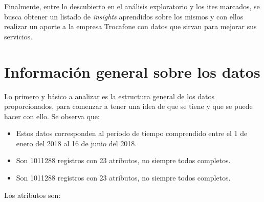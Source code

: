 \documentclass[a4paper]{article}
\begin{document}
Finalmente, entre lo descubierto en el análisis exploratorio y los ites marcados, se busca obtener un listado de \textit{insights} aprendidos sobre los mismos y con ellos realizar un aporte a la empresa Trocafone con datos que sirvan para mejorar sus servicios. 

\section{Información general sobre los datos}

Lo primero y básico a analizar es la estructura general de los datos proporcionados, para comenzar a tener una idea de que se tiene y que se puede hacer con ello. Se observa que:

\begin{itemize}
\item Estos datos corresponden al período de tiempo comprendido entre el 1 de enero del 2018 al 16 de junio del 2018.
\item Son 1011288 registros con 23 atributos, no siempre todos completos.
\item Son 1011288 registros con 23 atributos, no siempre todos completos.
\end{itemize}

Los atributos son:
\end{document}
